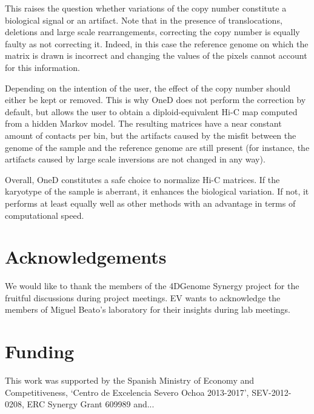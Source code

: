 \documentclass{bioinfo}
\begin{document}
This raises the question whether variations of the copy number constitute
a biological signal or an artifact. Note that in the presence of
translocations, deletions and large scale rearrangements, correcting the
copy number is equally faulty as not correcting it. Indeed, in this case
the reference genome on which the matrix is drawn is incorrect and
changing the values of the pixels cannot account for this information.

Depending on the intention of the user, the effect of the copy number
should either be kept or removed. This is why OneD does not perform
the correction by default, but allows the user to obtain a
diploid-equivalent Hi-C map computed from a hidden Markov model. The
resulting matrices have a near constant amount of contacts per bin, but
the artifacts caused by the misfit between the genome of the sample and
the reference genome are still present (for instance, the artifacts caused
by large scale inversions are not changed in any way).

Overall, OneD constitutes a safe choice to normalize Hi-C matrices. If the
karyotype of the sample is aberrant, it enhances the biological variation.
If not, it performs at least equally well as other methods with an
advantage in terms of computational speed.



\section*{Acknowledgements}

We would like to thank the members of the 4DGenome Synergy project for the
fruitful discussions during project meetings. EV wants to acknowledge
the members of Miguel Beato's laboratory for their insights during lab
meetings.

\section*{Funding}

This work was supported by the Spanish Ministry of Economy and
Competitiveness, ‘Centro de Excelencia Severo Ochoa 2013-2017’,
SEV-2012-0208, ERC Synergy Grant 609989 and...

\vspace*{-12pt}



\end{document}
